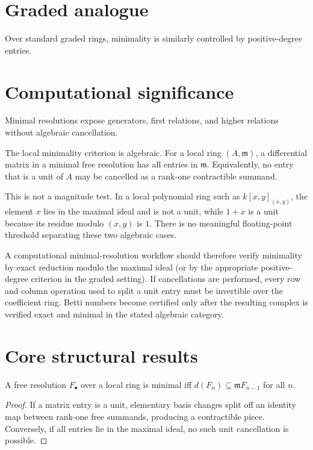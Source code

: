 \section{Graded analogue}
Over standard graded rings, minimality is similarly controlled by positive-degree entries.

\section{Computational significance}
Minimal resolutions expose generators, first relations, and higher relations without algebraic cancellation.

\begin{remark}
The local minimality criterion is algebraic.  For a local ring
\((A,\mathfrak m)\), a differential matrix in a minimal free resolution has
all entries in \(\mathfrak m\).  Equivalently, no entry that is a unit of
\(A\) may be cancelled as a rank-one contractible summand.

This is not a magnitude test.  In a local polynomial ring such as
\(k[x,y]_{(x,y)}\), the element \(x\) lies in the maximal ideal and is not a
unit, while \(1+x\) is a unit because its residue modulo \((x,y)\) is \(1\).
There is no meaningful floating-point threshold separating these two
algebraic cases.

A computational minimal-resolution workflow should therefore verify
minimality by exact reduction modulo the maximal ideal (or by the appropriate
positive-degree criterion in the graded setting).  If cancellations are
performed, every row and column operation used to split a unit entry must be
invertible over the coefficient ring.  Betti numbers become certified only
after the resulting complex is verified exact and minimal in the stated
algebraic category.
\end{remark}

\section{Core structural results}

\begin{theorem}\label{thm:v25-01}
A free resolution $F_\bullet$ over a local ring is minimal iff $d(F_n)\subseteq\mathfrak mF_{n-1}$ for all $n$.
\begin{proof}
If a matrix entry is a unit, elementary basis changes split off an identity map between rank-one free summands, producing a contractible piece. Conversely, if all entries lie in the maximal ideal, no such unit cancellation is possible.
\end{proof}
\end{theorem}

